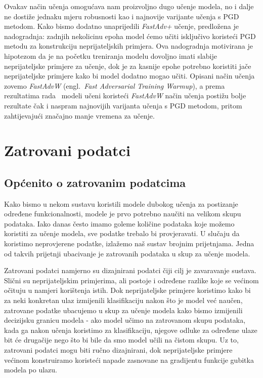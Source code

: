 \documentclass[times, utf8, zavrsni, numeric]{fer}
\begin{document}
\pagebreak

Ovakav način učenja omogućava nam proizvoljno dugo učenje modela, no i dalje ne dostiže jednaku mjeru robusnosti kao i najnovije varijante učenja s PGD metodom.
Kako bismo dodatno unaprijedili \textit{FastAdv+} učenje, predložena je nadogradnja: zadnjih nekolicinu epoha model ćemo učiti isključivo koristeći PGD metodu za konstrukciju neprijateljskih primjera. 
Ova nadogradnja motivirana je hipotezom da je na početku treniranja modelu dovoljno imati slabije neprijateljske primjere za učenje, 
dok je za kasnije epohe potrebno koristiti jače neprijateljske primjere kako bi model dodatno mogao učiti. Opisani način učenja zovemo \textit{FastAdvW} (engl.\ \textit{Fast Adversarial Training Warmup}),
a prema rezultatima rada~\cite{li2020towards} modeli učeni koristeći \textit{FastAdvW} način učenja postižu bolje rezultate čak i naspram najnovijih varijanta učenja s PGD metodom, 
pritom zahtijevajući značajno manje vremena za učenje.

\chapter{Zatrovani podatci}

\section{Općenito o zatrovanim podatcima}

Kako bismo u nekom sustavu koristili modele dubokog učenja za postizanje određene funkcionalnosti, modele je prvo potrebno naučiti na velikom skupu podataka. 
Iako danas često imamo goleme količine podataka koje možemo koristiti za učenje modela, sve podatke trebalo bi provjeravati.
U slučaju da koristimo neprovjerene podatke, izlažemo naš sustav brojnim prijetnjama.
Jedna od takvih prijetnji ubacivanje je zatrovanih podataka u skup za učenje modela. 

Zatrovani podatci namjerno su dizajnirani podatci čiji cilj je zavaravanje sustava.
Slični su neprijateljskim primjerima, ali postoje i određene razlike koje se većinom očituju u namjeri korištenja istih.
Dok neprijateljske primjere koristimo kako bi za neki konkretan ulaz izmijenili klasifikaciju nakon što je model već naučen,
zatrovane podatke ubacujemo u skup za učenje modela kako bismo izmijenili decizijsku granicu modela - ako model učimo na zatrovanom skupu podataka,
kada ga nakon učenja koristimo za klasifikaciju, njegove odluke za određene ulaze bit će drugačije nego što bi bile da smo model učili na čistom skupu.
Uz to, zatrovani podatci mogu biti ručno dizajnirani, dok neprijateljske primjere većinom konstruiramo koristeći napade zasnovane na gradijentu funkcije gubitka modela po ulazu.
\end{document}
